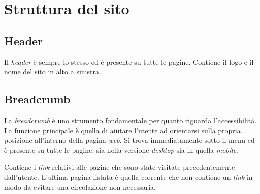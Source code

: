 \section{Struttura del sito}\label{sec:struttura}

\subsection{Header}
Il \textit{header} è sempre lo stesso ed è presente su tutte le pagine. Contiene il logo e il nome del sito in alto a sinistra.

\subsection{Breadcrumb}
La \textit{breadcrumb} è uno strumento fondamentale per quanto riguarda l’accessibilità. La funzione principale è quella di aiutare l'utente ad orientarsi sulla propria posizione all'interno della pagina \textit{web}. Si trova immediatamente sotto il menu ed è presente su tutte le pagine, sia nella versione \textit{desktop} sia in quella \textit{mobile}.

Contiene i \textit{link} relativi alle pagine che sono state visitate precedentemente dall’utente. L'ultima pagina listata è quella corrente che non contiene un \textit{link} in modo da evitare una circolazione non necessaria.

